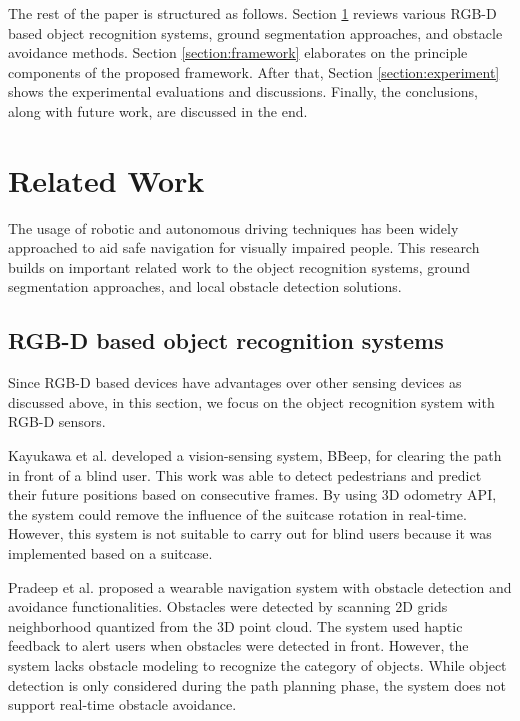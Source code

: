 \documentclass{ieeeaccess}
\begin{document}
The rest of the paper is structured as follows. Section \ref{section:relatedwork} reviews various RGB-D based object recognition systems, ground segmentation approaches, and obstacle avoidance methods. Section \ref{section:framework} elaborates on the principle components of the proposed framework. After that, Section \ref{section:experiment} shows the experimental evaluations and discussions. Finally, the conclusions, along with future work, are discussed in the end.

\section{Related Work} \label{section:relatedwork}
The usage of robotic and autonomous driving techniques has been widely approached to aid safe navigation for visually impaired people. This research builds on important related work to the object recognition systems, ground segmentation approaches, and local obstacle detection solutions.

\subsection{RGB-D based object recognition systems}
Since RGB-D based devices have advantages over other sensing devices as discussed above, in this section, we focus on the object recognition system with RGB-D sensors.   

Kayukawa et al. \cite{kayukawa2019bbeep} developed a vision-sensing system, BBeep, for clearing the path in front of a blind user. This work was able to detect pedestrians and predict their future positions based on consecutive frames. By using 3D odometry API,  the system could remove the influence of the suitcase rotation in real-time. However, this system is not suitable to carry out for blind users because it was implemented based on a suitcase. 

Pradeep et al. \cite{pradeep2010robot} proposed a wearable navigation system with obstacle detection and avoidance functionalities. Obstacles were detected by scanning 2D grids neighborhood quantized from the 3D point cloud. The system used haptic feedback to alert users when obstacles were detected in front. However, the system lacks obstacle modeling to recognize the category of objects. While object detection is only considered during the path planning phase, the system does not support real-time obstacle avoidance.
\end{document}
